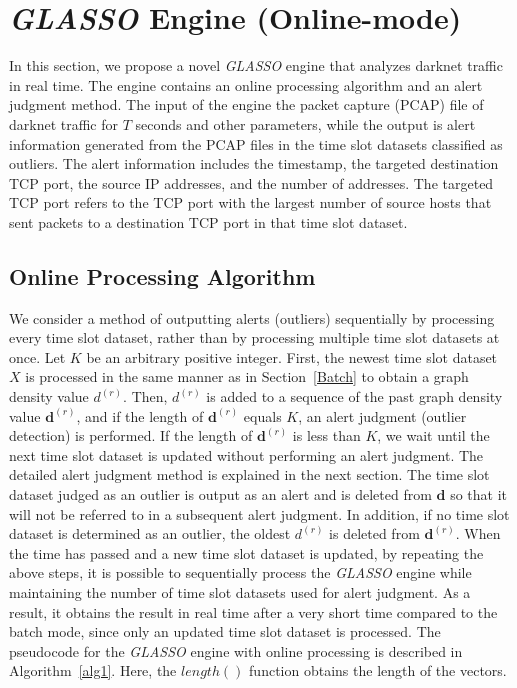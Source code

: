 \documentclass[conference]{IEEEtran}
\begin{document}
\section{\textit{GLASSO} Engine (Online-mode)}
\label{GLASSO}
In this section, we propose a novel \textit{GLASSO} engine that analyzes darknet traffic in real time.
The engine contains an online processing algorithm and an alert judgment method.
The input of the engine the packet capture (PCAP) file of darknet traffic for $T$ seconds and other parameters, while the output is alert information generated from the PCAP files in the time slot datasets classified as outliers.
The alert information includes the timestamp, the targeted destination TCP port, the source IP addresses, and the number of addresses.
The targeted TCP port refers to the TCP port with the largest number of source hosts that sent packets to a destination TCP port in that time slot dataset.


\subsection{Online Processing Algorithm}
We consider a method of outputting alerts (outliers) sequentially by processing every time slot dataset, rather than by processing multiple time slot datasets at once.
Let $K$ be an arbitrary positive integer.
First, the newest time slot dataset $X$ is processed in the same manner as in Section~\ref{Batch} to obtain a graph density value $d^{(r)}$.
Then, $d^{(r)}$ is added to a sequence of the past graph density value $\bm{d}^{(r)}$, and if the length of $\bm{d}^{(r)}$ equals $K$, an alert judgment (outlier detection) is performed.
If the length of $\bm{d}^{(r)}$ is less than $K$, we wait until the next time slot dataset is updated without performing an alert judgment.
The detailed alert judgment method is explained in the next section.
The time slot dataset judged as an outlier is output as an alert and is deleted from $\bm{d}$ so that it will not be referred to in a subsequent alert judgment.
In addition, if no time slot dataset is determined as an outlier, the oldest $d^{(r)}$ is deleted from $\bm{d}^{(r)}$.
When the time has passed and a new time slot dataset is updated, by repeating the above steps, it is possible to sequentially process the \textit{GLASSO} engine while maintaining the number of time slot datasets used for alert judgment.
As a result, it obtains the result in real time after a very short time compared to the batch mode, since only an updated time slot dataset is processed.
The pseudocode for the \textit{GLASSO} engine with online processing is described in Algorithm~\ref{alg1}.
Here, the $length()$ function obtains the length of the vectors.
\end{document}
